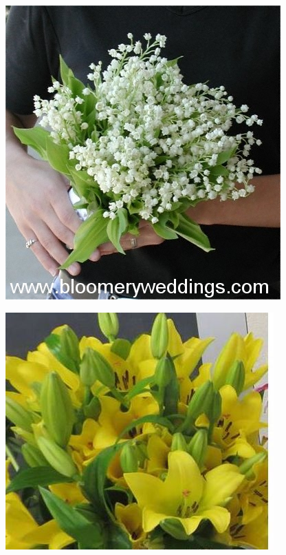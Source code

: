 \documentclass{article}
\begin{document}
\begin{center}
\includegraphics[height=0.925\paperheight]{../Lily-of-the-Valley_Bouquet.jpg}
\end{center}
\newpage

\begin{center}
\includegraphics[height=0.925\paperheight]{../Lily_Asiatic.jpg}
\end{center}
\newpage
\end{document}

